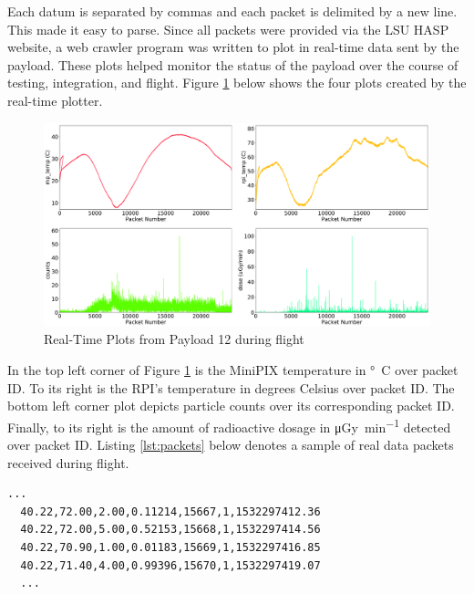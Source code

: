 Each datum is separated by commas and each packet is delimited by a new line. This made it easy to parse. Since all packets were provided 
via the LSU HASP website, a web crawler program was written to plot in real-time data sent by the payload. These plots helped monitor the 
status of the payload over the course of testing, integration, and flight. Figure \ref{fig:rtp} below shows the four plots created by the 
real-time plotter. 

\begin{figure}[H]
	\begin{center}
	\includegraphics[width=\textwidth]{figures/2018EnvironmentalPlots.pdf}
	\caption{Real-Time Plots from Payload 12 during flight}
	\label{fig:rtp}
	\end{center}
\end{figure}

In the top left corner of Figure \ref{fig:rtp} is the MiniPIX temperature in \si{\degree C} over packet ID. 
To its right is the RPI's temperature in degrees Celsius over packet ID. 
The bottom left corner plot depicts particle counts over its corresponding packet ID. 
Finally, to its right is the amount of radioactive dosage in \si{\micro\gray\per\minute} detected over packet ID.
Listing \ref{lst:packets} below denotes a sample of real data packets received during flight. 

\bigskip
\lstset{basicstyle=\small, numbers=left, xleftmargin=2em, frame=tb, label = Downlinks, framexleftmargin=1.5em}
\begin{lstlisting}[caption = Sample of downlinked data packets ID: 15667 - 15670, label={lst:packets}]
  ...
  40.22,72.00,2.00,0.11214,15667,1,1532297412.36
  40.22,72.00,5.00,0.52153,15668,1,1532297414.56
  40.22,70.90,1.00,0.01183,15669,1,1532297416.85
  40.22,71.40,4.00,0.99396,15670,1,1532297419.07
  ...
\end{lstlisting}

